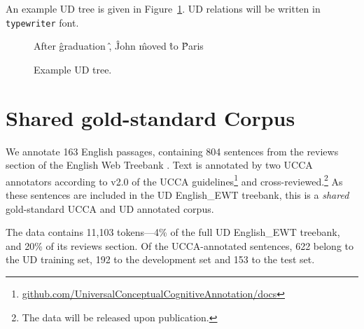 \documentclass[11pt,a4paper]{article}
\newcommand{\daniel}[1]{\footnote{\color{blue}DH: #1}}
\begin{document}
An example UD tree is given in Figure~\ref{fig:original_example_ud}.
UD relations will be written in \texttt{typewriter} font.

\begin{figure}[th]
  \centering
    \begin{dependency}[text only label, label style={above,font=\tt}, font=\small]
    \begin{deptext}[column sep=.8em,ampersand replacement=\^]
    After \^ graduation \^ , \^ John \^ moved \^ to \^ Paris \\
    \end{deptext}
    \end{dependency}
\caption{Example UD tree.\label{fig:original_example_ud}}
\end{figure}

\section{Shared gold-standard Corpus}\label{sec:shared}

We annotate 163 English passages, containing 804 sentences
from the reviews section of the 
English Web Treebank \cite[EWT; ][]{bies2012english}.
Text is annotated by two UCCA annotators
according to v2.0 of the UCCA
guidelines\footnote{\tiny\url{github.com/UniversalConceptualCognitiveAnnotation/docs}}
and cross-reviewed.\footnote{The data will be released upon publication.}
As these sentences are included in the UD
English\_EWT treebank, this is a \textit{shared} gold-standard UCCA and UD
annotated corpus.

The data contains 11,103 tokens---4\% of the full UD English\_EWT treebank,
and 20\% of its reviews section.
Of the UCCA-annotated sentences, 622 belong to the UD training set,
192 to the development set and 153 to the test set.

\end{document}
